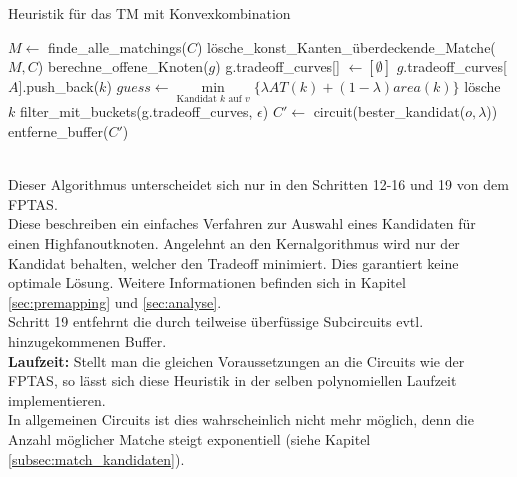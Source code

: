 \documentclass[11pt, a4paper, german]{article}
\begin{document}
\LinesNumbered
\begin{algorithm}[H]
\DontPrintSemicolon
\caption{Heuristik f\"ur das TM mit Konvexkombination}

   $M \gets$ finde\_alle\_matchings($C$)\;
   lösche\_konst\_Kanten\_überdeckende\_Matche($M, C$)\;
        {
			berechne\_offene\_Knoten($g$)\;	 
        }
  {
    g.tradeoff\_curves[] $\gets [\emptyset]$\;
    {
      {
        {
        	 {
			$g$.tradeoff\_curves[$A$].push\_back($k$)\;      	 
        	 }  
        }
      }
    }
  {
    $guess \gets \min\limits_{\text{Kandidat }k\text{ auf }v}\{ \lambda AT(k) + (1-\lambda) area(k)  \}$\;
    {
      {
	l\"osche $k$\;
      }
    }
  }    
    filter\_mit\_buckets(g.tradeoff\_curves, $\epsilon$)\;    
  }
  $C' \gets $ circuit(bester\_kandidat($o, \lambda$))\;
  \Return entferne\_buffer($C'$)\;
\end{algorithm}\ \\

Dieser Algorithmus unterscheidet sich nur in den Schritten 12-16 und 19 von dem FPTAS.\\
Diese beschreiben ein einfaches Verfahren zur Auswahl eines Kandidaten für einen Highfanoutknoten. Angelehnt an den Kernalgorithmus wird nur der Kandidat behalten, welcher den Tradeoff minimiert. Dies garantiert keine optimale Lösung. Weitere Informationen befinden sich in Kapitel \ref{sec:premapping} und \ref{sec:analyse}. \\
Schritt 19 entfehrnt die durch teilweise überfüssige Subcircuits evtl. hinzugekommenen Buffer.\\

{\bf Laufzeit: } Stellt man die gleichen Voraussetzungen an die Circuits wie der FPTAS, so lässt sich diese Heuristik in der selben polynomiellen Laufzeit implementieren.\\
In allgemeinen Circuits ist dies wahrscheinlich nicht mehr möglich, denn die Anzahl möglicher Matche steigt exponentiell  (siehe Kapitel \ref{subsec:match_kandidaten}).
\end{document}
